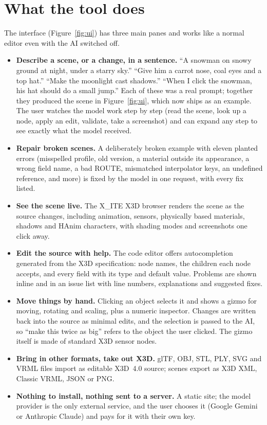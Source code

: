 \documentclass[10pt,a4paper]{article}
\begin{document}
\section{What the tool does}
The interface (Figure~\ref{fig:ui}) has three main panes and works like a normal editor even with the AI switched off.

\begin{itemize}
\item \textbf{Describe a scene, or a change, in a sentence.} ``A snowman on snowy ground at night, under a starry sky.'' ``Give him a carrot nose, coal eyes and a top hat.'' ``Make the moonlight cast shadows.'' ``When I click the snowman, his hat should do a small jump.'' Each of these was a real prompt; together they produced the scene in Figure~\ref{fig:ui}, which now ships as an example. The user watches the model work step by step (read the scene, look up a node, apply an edit, validate, take a screenshot) and can expand any step to see exactly what the model received.
\item \textbf{Repair broken scenes.} A deliberately broken example with eleven planted errors (misspelled profile, old version, a material outside its appearance, a wrong field name, a bad ROUTE, mismatched interpolator keys, an undefined reference, and more) is fixed by the model in one request, with every fix listed.
\item \textbf{See the scene live.} The X\_ITE X3D browser renders the scene as the source changes, including animation, sensors, physically based materials, shadows and HAnim characters, with shading modes and screenshots one click away.
\item \textbf{Edit the source with help.} The code editor offers autocompletion generated from the X3D specification: node names, the children each node accepts, and every field with its type and default value. Problems are shown inline and in an issue list with line numbers, explanations and suggested fixes.
\item \textbf{Move things by hand.} Clicking an object selects it and shows a gizmo for moving, rotating and scaling, plus a numeric inspector. Changes are written back into the source as minimal edits, and the selection is passed to the AI, so ``make this twice as big'' refers to the object the user clicked. The gizmo itself is made of standard X3D sensor nodes.
\item \textbf{Bring in other formats, take out X3D.} glTF, OBJ, STL, PLY, SVG and VRML files import as editable X3D~4.0 source; scenes export as X3D XML, Classic VRML, JSON or PNG.
\item \textbf{Nothing to install, nothing sent to a server.} A static site; the model provider is the only external service, and the user chooses it (Google Gemini or Anthropic Claude) and pays for it with their own key.
\end{itemize}
\end{document}

